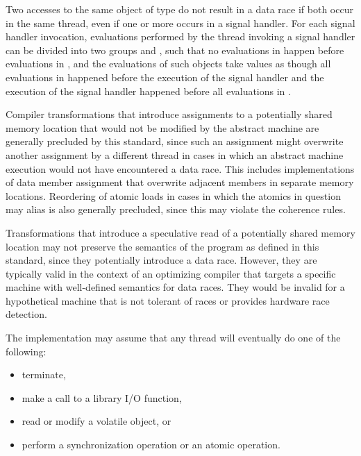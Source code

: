 \pnum
Two accesses to the same object of type  do not
result in a data race if both occur in the same thread, even if one or more
occurs in a signal handler. For each signal handler invocation, evaluations
performed by the thread invoking a signal handler can be divided into two
groups  and , such that no evaluations in
 happen before evaluations in , and the
evaluations of such  objects take values as though
all evaluations in  happened before the execution of the signal
handler and the execution of the signal handler happened before all evaluations
in .

\pnum
\begin{note} Compiler transformations that introduce assignments to a potentially
shared memory location that would not be modified by the abstract machine are
generally precluded by this standard, since such an assignment might overwrite
another assignment by a different thread in cases in which an abstract machine
execution would not have encountered a data race. This includes implementations
of data member assignment that overwrite adjacent members in separate memory
locations. Reordering of atomic loads in cases in which the atomics in question
may alias is also generally precluded, since this may violate the coherence
rules. \end{note}

\pnum
\begin{note} Transformations that introduce a speculative read of a potentially
shared memory location may not preserve the semantics of the \Cpp program as
defined in this standard, since they potentially introduce a data race. However,
they are typically valid in the context of an optimizing compiler that targets a
specific machine with well-defined semantics for data races. They would be
invalid for a hypothetical machine that is not tolerant of races or provides
hardware race detection. \end{note}

\pnum
The implementation may assume that any thread will eventually do one of the 
following:

\begin{itemize}
\item 
terminate,

\item
make a call to a library I/O function,

\item
read or modify a volatile object, or

\item
perform a synchronization operation or an atomic operation.
\end{itemize}

